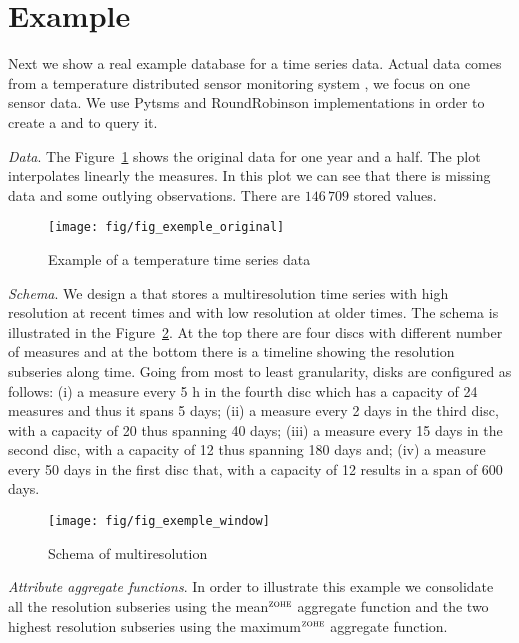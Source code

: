 \section{Example}
\label{sec:example}


Next we show a real example database for a time series data. Actual
data comes from a temperature distributed sensor monitoring system
\cite{alippi10}, we focus on one sensor data. We use Pytsms and
RoundRobinson implementations in order to create a  and
to query it.

\emph{Data}. The Figure~\ref{fig:exemple:original} shows the original
data for one year and a half. The plot interpolates linearly the
measures. In this plot we can see that there is missing data and some
outlying observations. There are $146\,709$ stored values.

\begin{figure}[tp]
  \centering
  \texttt{[image: fig/fig\_exemple\_original]}
  \caption{Example of a temperature time series data}
  \label{fig:exemple:original}
\end{figure}

\emph{Schema}. We design a  that stores a multiresolution
time series with high resolution at recent times and with low
resolution at older times. The schema is illustrated in the
Figure~\ref{fig:exemple:window}. At the top there are four discs with
different number of measures and at the bottom there is a timeline
showing the resolution subseries along time. Going from most to least
granularity, disks are configured as follows: (i) a measure every 5 h
in the fourth disc which has a capacity of 24 measures and thus it
spans 5 days; (ii) a measure every 2 days in the third disc, with a
capacity of 20 thus spanning 40 days; (iii) a measure every 15 days in
the second disc, with a capacity of 12 thus spanning 180 days and;
(iv) a measure every 50 days in the first disc that, with a capacity
of 12 results in a span of 600 days.

\begin{figure}[tp]
  \centering
  \setlength{\unitlength}{1.3mm}
  \texttt{[image: fig/fig\_exemple\_window]}
  \caption{Schema of multiresolution}
  \label{fig:exemple:window}
\end{figure}

\emph{Attribute aggregate functions}.  In order to illustrate this
example we consolidate all the resolution subseries using the
mean$^\zohe{}$ aggregate function and the two highest resolution
subseries using the maximum$^\zohe{}$ aggregate function. 




